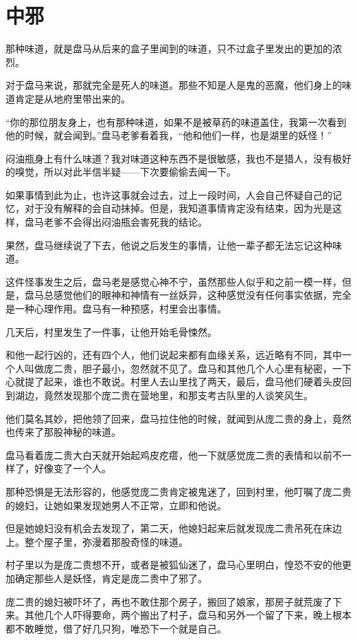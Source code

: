 \chapter{中邪}

那种味道，就是盘马从后来的盒子里闻到的味道，只不过盒子里发出的更加的浓烈。

对于盘马来说，那就完全是死人的味道。那些不知是人是鬼的恶魔，他们身上的味道肯定是从地府里带出来的。

“你的那位朋友身上，也有那种味道，如果不是被草药的味道盖住，我第一次看到他的时候，就会闻到。”盘马老爹看着我，“他和他们一样，也是湖里的妖怪！”

闷油瓶身上有什么味道？我对味道这种东西不是很敏感，我也不是猎人，没有极好的嗅觉，所以对此半信半疑——下次要偷偷去闻一下。

如果事情到此为止，也许这事就会过去，过上一段时间，人会自己怀疑自己的记忆，对于没有解释的会自动抹掉。但是，我知道事情肯定没有结束，因为光是这样，盘马老爹不会得出闷油瓶会害死我的结论。

果然，盘马继续说了下去，他说之后发生的事情，让他一辈子都无法忘记这种味道。

这件怪事发生之后，盘马老是感觉心神不宁，虽然那些人似乎和之前一模一样，但是，盘马总感觉他们的眼神和神情有一丝妖异，这种感觉没有任何事实依据，完全是一种心理作用。盘马有一种预感，村里会出事情。

几天后，村里发生了一件事，让他开始毛骨悚然。

和他一起行凶的，还有四个人，他们说起来都有血缘关系，远近略有不同，其中一个人叫做庞二贵，胆子最小，忽然就不见了。盘马和其他几个人心里有秘密，一下心就提了起来，谁也不敢说。村里人去山里找了两天，最后，盘马他们硬着头皮回到湖边，竟然发现那个庞二贵在营地里，和那支考古队里的人谈笑风生。

他们莫名其妙，把他领了回来，盘马拉住他的时候，就闻到从庞二贵的身上，竟然也传来了那股神秘的味道。

盘马看着庞二贵大白天就开始起鸡皮疙瘩，他一下就感觉庞二贵的表情和以前不一样了，好像变了一个人。

那种恐惧是无法形容的，他感觉庞二贵肯定被鬼迷了，回到村里，他叮嘱了庞二贵的媳妇，让她如果发现她男人不正常，立即和他说。

但是她媳妇没有机会去发现了，第二天，他媳妇起来后就发现庞二贵吊死在床边上。整个屋子里，弥漫着那股奇怪的味道。

村子里以为是庞二贵想不开，或者是被狐仙迷了，盘马心里明白，惶恐不安的他更加确定那些人是妖怪，肯定是庞二贵中了邪了。

庞二贵的媳妇被吓坏了，再也不敢住那个房子，搬回了娘家，那房子就荒废了下来。其他几个人吓得要命，两个搬出了村子，盘马和另外一个留了下来，晚上根本都不敢睡觉，借了好几只狗，唯恐下一个就是自己。

